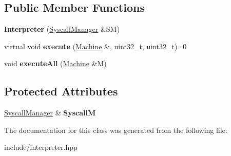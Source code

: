 \subsection*{Public Member Functions}
\begin{DoxyCompactItemize}
\item 
{\bfseries Interpreter} (\hyperlink{classdbt_1_1_syscall_manager}{Syscall\+Manager} \&SM)\hypertarget{classdbt_1_1_interpreter_a3d7898f615730fefb25fbccac673907b}{}\label{classdbt_1_1_interpreter_a3d7898f615730fefb25fbccac673907b}

\item 
virtual void {\bfseries execute} (\hyperlink{classdbt_1_1_machine}{Machine} \&, uint32\+\_\+t, uint32\+\_\+t)=0\hypertarget{classdbt_1_1_interpreter_aa660f40fa6b58301c42e499f6a0327c9}{}\label{classdbt_1_1_interpreter_aa660f40fa6b58301c42e499f6a0327c9}

\item 
void {\bfseries execute\+All} (\hyperlink{classdbt_1_1_machine}{Machine} \&M)\hypertarget{classdbt_1_1_interpreter_a5e5fc40019057b107ebfd0b6b8443751}{}\label{classdbt_1_1_interpreter_a5e5fc40019057b107ebfd0b6b8443751}

\end{DoxyCompactItemize}
\subsection*{Protected Attributes}
\begin{DoxyCompactItemize}
\item 
\hyperlink{classdbt_1_1_syscall_manager}{Syscall\+Manager} \& {\bfseries SyscallM}\hypertarget{classdbt_1_1_interpreter_ad9cba79a792cf3b8e7e641ccc3587c2a}{}\label{classdbt_1_1_interpreter_ad9cba79a792cf3b8e7e641ccc3587c2a}

\end{DoxyCompactItemize}


The documentation for this class was generated from the following file\+:\begin{DoxyCompactItemize}
\item 
include/interpreter.\+hpp\end{DoxyCompactItemize}
